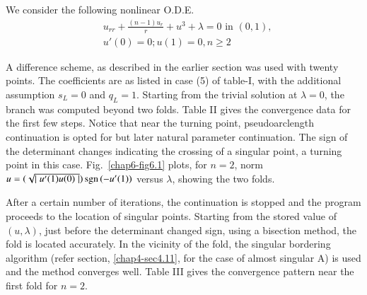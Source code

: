 \setcounter{exam}{0} 
\begin{exam}\label{chap6-exam1}
We consider the following nonlinear O.D.E.
\begin{equation*}
\begin{split}
& u_{rr}+\frac{(n-1)u_r}{r}+u^3+\lambda =0 \text{ in } ( 0, 1),\\ 
& u'(0)=0; u(1) = 0, n\ge 2
\end{split}\tag{6.18}\label{chap6-eq6.18}
\end{equation*}\pageoriginale

A difference scheme, as described in the earlier section was used with
twenty points. The coefficients are as listed in case (5) of
table-I, with the additional assumption $s_L = 0$ and $q_L
=1$. Starting from the trivial solution at $\lambda =0$, the branch was
computed beyond two folds. Table II gives the convergence data for
the first few steps. Notice that near the turning point,
pseudoarclength continuation is opted for but later natural parameter
continuation. The sign of the determinant  changes indicating the
crossing of a singular point, a turning point in this
case. Fig.~\ref{chap6-fig6.1} plots, for $n=2$, norm $u=(\sqrt{\mid u'
  (1)u(0)\mid}) \text{\,sgn\,}(-u' (1))$ versus $\lambda $, showing
the two folds.  

After a certain number of iterations, the continuation is stopped and
the program proceeds to the location of singular points. Starting from
the stored value of $(u,\lambda)$, just before the determinant changed
sign, using a bisection method, the fold is located accurately. In the
vicinity of the fold, the singular bordering algorithm (refer section,
\ref{chap4-sec4.11}, for the case of almost singular A) is used and the method
converges well. Table III gives the convergence pattern near the
first fold for $n=2$. 
\end{exam}


